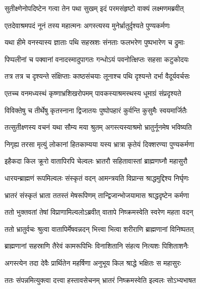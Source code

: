 \twolineshloka
{सुतीक्ष्णेनोपदिष्टेन गत्वा तेन पथा सुखम्}
{इदं परमसंहृष्टो वाक्यं लक्ष्मणमब्रवीत्} %

\twolineshloka
{एतदेवाश्रमपदं नूनं तस्य महात्मनः}
{अगस्त्यस्य मुनेर्भ्रातुर्दृश्यते पुण्यकर्मणः} %

\twolineshloka
{यथा हीमे वनस्यास्य ज्ञाताः पथि सहस्रशः}
{संनताः फलभरेण पुष्पभारेण च द्रुमाः} %

\twolineshloka
{पिप्पलीनां च पक्वानां वनादस्मादुपागतः}
{गन्धोऽयं पवनोत्क्षिप्तः सहसा कटुकोदयः} %

\twolineshloka
{तत्र तत्र च दृश्यन्ते संक्षिप्ताः काष्ठसंचयाः}
{लूनाश्च पथि दृश्यन्ते दर्भा वैदूर्यवर्चसः} %

\twolineshloka
{एतच्च वनमध्यस्थं कृष्णाभ्रशिखरोपमम्}
{पावकस्याश्रमस्थस्य धूमाग्रं संप्रदृश्यते} %

\twolineshloka
{विविक्तेषु च तीर्थेषु कृतस्नाना द्विजातयः}
{पुष्पोपहारं कुर्वन्ति कुसुमैः स्वयमार्जितैः} %

\twolineshloka
{तत्सुतीक्ष्णस्य वचनं यथा सौम्य मया श्रुतम्}
{अगस्त्यस्याश्रमो भ्रातुर्नूनमेष भविष्यति} %

\twolineshloka
{निगृह्य तरसा मृत्युं लोकानां हितकाम्यया}
{यस्य भ्रात्रा कृतेयं दिक्शरण्या पुण्यकर्मणा} %

\twolineshloka
{इहैकदा किल क्रूरो वातापिरपि चेल्वलः}
{भ्रातरौ सहितावास्तां ब्राह्मणघ्नौ महासुरौ} %

\twolineshloka
{धारयन्ब्राह्मणं रूपमिल्वलः संस्कृतं वदन्}
{आमन्त्रयति विप्रान्स श्राद्धमुद्दिश्य निर्घृणः} %

\twolineshloka
{भ्रातरं संस्कृतं भ्राता ततस्तं मेषरूपिणम्}
{तान्द्विजान्भोजयामास श्राद्धदृष्टेन कर्मणा} %

\twolineshloka
{ततो भुक्तवतां तेषां विप्राणामिल्वलोऽब्रवीत्}
{वातापे निष्क्रमस्वेति स्वरेण महता वदन्} %

\twolineshloka
{ततो भ्रातुर्वचः श्रुत्वा वातापिर्मेषवन्नदन्}
{भित्त्वा भित्वा शरीराणि ब्राह्मणानां विनिष्पतत्} %

\twolineshloka
{ब्राह्मणानां सहस्राणि तैरेवं कामरूपिभिः}
{विनाशितानि संहत्य नित्यशः पिशिताशनैः} %

\twolineshloka
{अगस्त्येन तदा देवैः प्रार्थितेन महर्षिणा}
{अनुभूय किल श्राद्धे भक्षितः स महासुरः} %

\twolineshloka
{ततः संपन्नमित्युक्त्वा दत्त्वा हस्तावसेचनम्}
{भ्रातरं निष्क्रमस्वेति इल्वलः सोऽभ्यभाषत} %

